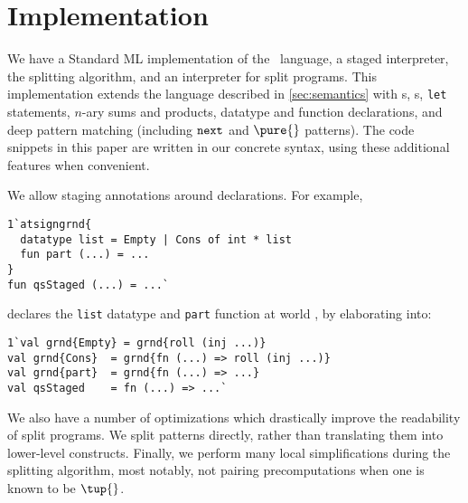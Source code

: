 
\section {Implementation}
\label{sec:implementation}

\begin{abstrsyn}
We have a Standard ML implementation of the \lang\ language, a staged
interpreter, the splitting algorithm, and an interpreter for split programs.
This implementation extends the language described in \ref{sec:semantics} with 
\rmint{}s,
\rmbool{}s,
\texttt{let} statements,
$n$-ary sums and products,
datatype and function declarations, and
deep pattern matching (including ${\tt next}{}$ and $\pure{}$ patterns).
The code snippets in this paper are written in our concrete syntax, using 
these additional features when convenient.

We allow staging annotations around declarations. For example,
\begin{lstlisting}
1`atsigngrnd{
  datatype list = Empty | Cons of int * list
  fun part (...) = ...
}
fun qsStaged (...) = ...`
\end{lstlisting}
declares the \texttt{list} datatype and \texttt{part} function at world \bbonep,
by elaborating into:
\begin{lstlisting}
1`val grnd{Empty} = grnd{roll (inj ...)}
val grnd{Cons}  = grnd{fn (...) => roll (inj ...)}
val grnd{part}  = grnd{fn (...) => ...}
val qsStaged    = fn (...) => ...`
\end{lstlisting}

We also have a number of optimizations which drastically improve the readability
of split programs. We split patterns directly, rather than translating them into
lower-level constructs. Finally, we perform many local simplifications during
the splitting algorithm, most notably, not pairing precomputations when one is
known to be $\tup{}$.




\end{abstrsyn}
